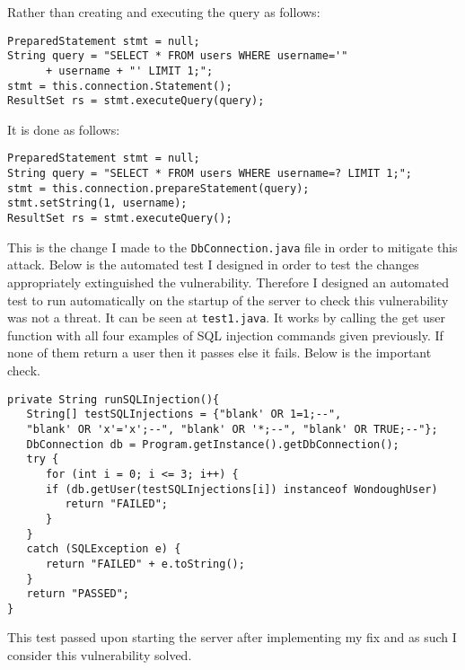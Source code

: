 Rather than creating and executing the query as follows:
\begin{verbatim}
PreparedStatement stmt = null;
String query = "SELECT * FROM users WHERE username='"
      + username + "' LIMIT 1;";
stmt = this.connection.Statement();
ResultSet rs = stmt.executeQuery(query);
\end{verbatim}
It is done as follows:
\begin{verbatim}
PreparedStatement stmt = null;
String query = "SELECT * FROM users WHERE username=? LIMIT 1;";
stmt = this.connection.prepareStatement(query);
stmt.setString(1, username);
ResultSet rs = stmt.executeQuery();
\end{verbatim}
This is the change I made to the \verb|DbConnection.java| file in order to mitigate this attack. Below is the automated test I designed in order to test the changes appropriately extinguished the
vulnerability. Therefore I designed an automated test to run automatically on the startup of the server to check this vulnerability was not a threat. It can be seen at \verb|test1.java|. It
works by calling the get user function with all four examples of SQL injection commands given previously. If none of them return a user then it passes else it fails. Below is the
important check.\begin{verbatim}
private String runSQLInjection(){
   String[] testSQLInjections = {"blank' OR 1=1;--",
   "blank' OR 'x'='x';--", "blank' OR '*;--", "blank' OR TRUE;--"};
   DbConnection db = Program.getInstance().getDbConnection();
   try {
      for (int i = 0; i <= 3; i++) {
      if (db.getUser(testSQLInjections[i]) instanceof WondoughUser)
         return "FAILED";
      }
   }
   catch (SQLException e) {
      return "FAILED" + e.toString();
   }
   return "PASSED";
}
\end{verbatim}
This test passed upon starting the server after implementing my fix and as such I consider this vulnerability solved.